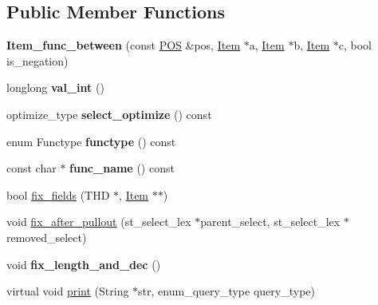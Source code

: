 \subsection*{Public Member Functions}
\begin{DoxyCompactItemize}
\item 
\mbox{\label{classItem__func__between_a4172f0c30d4f40a2d1c1f42183b85814}} 
{\bfseries Item\+\_\+func\+\_\+between} (const \mbox{\hyperlink{structYYLTYPE}{P\+OS}} \&pos, \mbox{\hyperlink{classItem}{Item}} $\ast$a, \mbox{\hyperlink{classItem}{Item}} $\ast$b, \mbox{\hyperlink{classItem}{Item}} $\ast$c, bool is\+\_\+negation)
\item 
\mbox{\label{classItem__func__between_a7d9c072e470ab10ed4c959a2c56d1d73}} 
longlong {\bfseries val\+\_\+int} ()
\item 
\mbox{\label{classItem__func__between_a59eec8e0f28d8d626eaf0bad64378f60}} 
optimize\+\_\+type {\bfseries select\+\_\+optimize} () const
\item 
\mbox{\label{classItem__func__between_acae670ef11f96d41ebcfd65a634222af}} 
enum Functype {\bfseries functype} () const
\item 
\mbox{\label{classItem__func__between_a093b3f2386851d61b6f2b8dbe1b84639}} 
const char $\ast$ {\bfseries func\+\_\+name} () const
\item 
bool \mbox{\hyperlink{classItem__func__between_aca3574854cf2d270a2eb3b3536d062cf}{fix\+\_\+fields}} (T\+HD $\ast$, \mbox{\hyperlink{classItem}{Item}} $\ast$$\ast$)
\item 
void \mbox{\hyperlink{classItem__func__between_ade856fd17d40b1e39a2cdde5591423f3}{fix\+\_\+after\+\_\+pullout}} (st\+\_\+select\+\_\+lex $\ast$parent\+\_\+select, st\+\_\+select\+\_\+lex $\ast$removed\+\_\+select)
\item 
\mbox{\label{classItem__func__between_a52b64fa0586413e805996d379d40aac6}} 
void {\bfseries fix\+\_\+length\+\_\+and\+\_\+dec} ()
\item 
virtual void \mbox{\hyperlink{classItem__func__between_ad23dd8c7e58553158f25fe513e5964fd}{print}} (String $\ast$str, enum\+\_\+query\+\_\+type query\+\_\+type)
$$
\end{DoxyCompactItemize}
